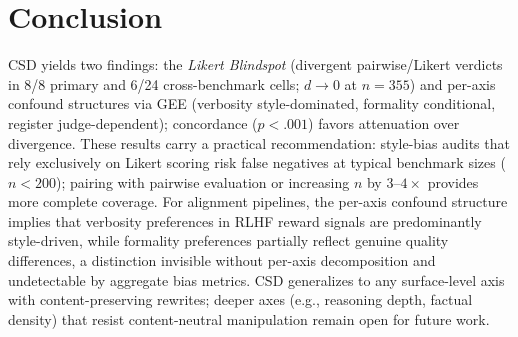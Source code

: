 \section{Conclusion}
\label{sec:conclusion}
CSD yields two findings: the \emph{Likert Blindspot} (divergent pairwise/Likert verdicts in 8/8 primary and 6/24 cross-benchmark cells; $d \!\to\! 0$ at $n{=}355$) and per-axis confound structures via GEE (verbosity style-dominated, formality conditional, register judge-dependent); concordance ($p < .001$) favors attenuation over divergence.
These results carry a practical recommendation: style-bias audits that rely exclusively on Likert scoring risk false negatives at typical benchmark sizes ($n < 200$); pairing with pairwise evaluation or increasing $n$ by $3$--$4\times$ provides more complete coverage.
For alignment pipelines, the per-axis confound structure implies that verbosity preferences in RLHF reward signals are predominantly style-driven, while formality preferences partially reflect genuine quality differences, a distinction invisible without per-axis decomposition and undetectable by aggregate bias metrics.
CSD generalizes to any surface-level axis with content-preserving rewrites; deeper axes (e.g., reasoning depth, factual density) that resist content-neutral manipulation remain open for future work.
